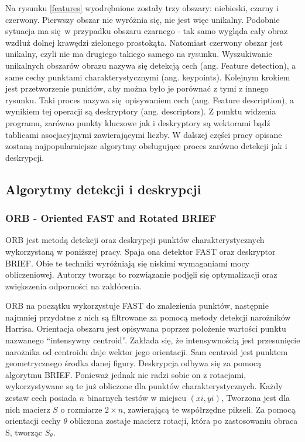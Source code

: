 \documentclass[12pt,twoside,polish]{article}
\begin{document}
Na rysunku \ref{features} wyodrębnione zostały trzy obszary: niebieski, czarny i czerwony. Pierwszy obszar nie wyróżnia się, nie jest więc unikalny. Podobnie sytuacja ma się w przypadku obszaru czarnego - tak samo wygląda cały obraz wzdłuż dolnej krawędzi zielonego prostokąta. Natomiast czerwony obszar jest unikalny, czyli nie ma drugiego takiego samego na rysunku. Wyszukiwanie unikalnych obszarów obrazu nazywa się detekcją cech (ang. Feature detection), a same cechy punktami charakterystycznymi (ang. keypoints). Kolejnym krokiem jest przetworzenie punktów, aby można było je porównać z tymi z innego rysunku. Taki proces nazywa się opisywaniem cech (ang. Feature description), a wynikiem tej operacji są deskryptory (ang. descriptors). Z punktu widzenia programu, zarówno punkty kluczowe jak i deskryptory są wektorami bądź tablicami asocjacyjnymi zawierającymi liczby. W dalszej części pracy opisane zostaną najpopularniejsze algorytmy obsługujące proces zarówno detekcji jak i deskrypcji.


\subsection{Algorytmy detekcji i deskrypcji}

\subsubsection[ORB]{ORB - Oriented FAST and Rotated BRIEF}

ORB jest metodą detekcji oraz deskrypcji punktów charakterystycznych wykorzystaną w poniższej pracy. Spaja ona detektor FAST oraz deskryptor BRIEF. Obie te techniki wyróżniają się niskimi wymaganiami mocy obliczeniowej. Autorzy tworząc to rozwiązanie podjęli się optymalizacji oraz zwiększenia odporności na zakłócenia.

ORB na początku wykorzystuje FAST do znalezienia punktów, następnie najmniej przydatne z nich są filtrowane za pomocą metody detekcji narożników Harrisa. Orientacja obszaru jest opisywana poprzez położenie wartości punktu nazwanego \enquote{intensywny centroid}. Zakłada się, że intensywnością jest przesunięcie narożnika od centroidu daje wektor jego orientacji. Sam centroid jest punktem geometrycznego środka danej figury. Deskrypcja odbywa się za pomocą algorytmu BRIEF. Ponieważ jednak nie radzi sobie on z rotacjami, wykorzystywane są te już obliczone dla punktów charakterystycznych. Każdy zestaw cech posiada $n$ binarnych testów w miejscu $(xi, yi)$, Tworzona jest dla nich macierz $S$ o rozmiarze $2 \times n$, zawierającą te współrzędne pikseli. Za pomocą orientacji cechy $\theta$ obliczona zostaje macierz rotacji, która po zastosowaniu obraca S, tworząc $ S_\theta $.
\end{document}

